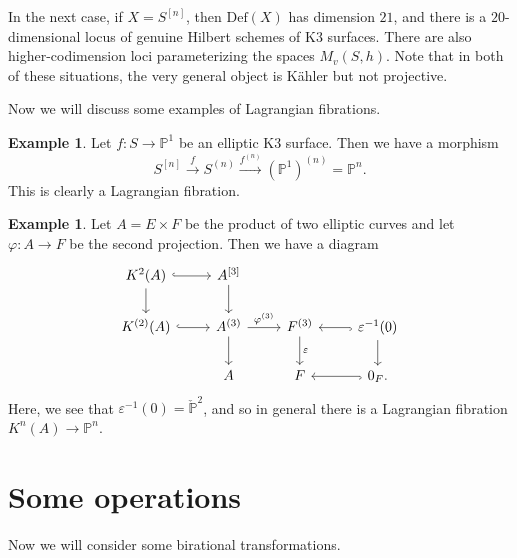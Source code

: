 \documentclass[leqno, openany]{memoir}
\theoremstyle{definition}
\newtheorem{exm}[thm]{Example}
\theoremstyle{remark}
\theoremstyle{plain}
\theoremstyle{definition}
\theoremstyle{remark}
\renewcommand{\P}{\mathbb{P}}
\newcommand{\ep}{\varepsilon}
\newcommand{\mr}[1]{\mathrm{#1}}
\begin{document}
In the next case, if $X = S^{[n]}$, then $\mr{Def}(X)$ has dimension $21$, and there is a $20$-dimensional locus of genuine Hilbert schemes of K3 surfaces. There are also higher-codimension loci parameterizing the spaces $M_v(S, h)$. Note that in both of these situations, the very general object is K\"ahler but not projective.

Now we will discuss some examples of Lagrangian fibrations.

\begin{exm}
    Let $f \colon S \to \P^1$ be an elliptic K3 surface. Then we have a morphism
    \[ S^{[n]} \xrightarrow{f} S^{(n)} \xrightarrow{f^{(n)}} {(\P^1)}^{(n)} = \P^n. \]
    This is clearly a Lagrangian fibration.
\end{exm}

\begin{exm}
    Let $A = E \times F$ be the product of two elliptic curves and let $\varphi \colon A \to F$ be the second projection. Then we have a diagram
    \begin{equation*}
    \begin{tikzcd}
        K^2(A) \ar[hookrightarrow]{r} \ar{d} & A^{[3]} \ar{d} \\
        K^{(2)}(A) \ar[hookrightarrow]{r} & A^{(3)} \ar{d} \ar{r}{\varphi^{(3)}} & F^{(3)} \ar{d}{\ep} & \ep^{-1}(0) \ar{d} \ar[hookrightarrow]{l} \\
        & A & F & 0_F \ar[hookrightarrow]{l}.
    \end{tikzcd}
    \end{equation*}
    Here, we see that $\ep^{-1}(0) = \check{\P}^2$, and so in general there is a Lagrangian fibration $K^n(A) \to \P^n$.
\end{exm}

\section{Some operations}%
\label{sec:some_operations}

Now we will consider some birational transformations. 
\end{document}
